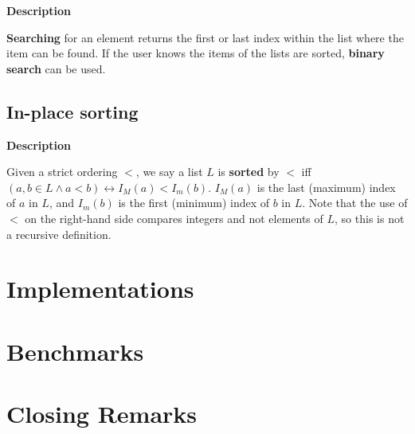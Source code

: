 \documentclass{article}
\newcommand{\descriptn}{\textbf{Description}}
\newcommand{\listname}{L}
\begin{document}
	\descriptn
	
	\textbf{Searching} for an element returns the first or last index within the list where the item can be found. If the user knows the items of the lists are sorted, \textbf{binary search} can be used.
	
	\subsection{In-place sorting}
	
	\descriptn
	
	Given a strict ordering $<$, we say a list $\listname$ is \textbf{sorted} by $<$ iff $\left(a, b \in \listname \land a < b\right) \leftrightarrow I_M(a) < I_m(b)$. $I_M(a)$ is the last (maximum) index of $a$ in $L$, and $I_m(b)$ is the first (minimum) index of $b$ in $L$. Note that the use of $<$ on the right-hand side compares integers and not elements of $L$, so this is not a recursive definition.
	
	\section{Implementations}
	
	\section{Benchmarks}
	
	\section{Closing Remarks}
\end{document}
